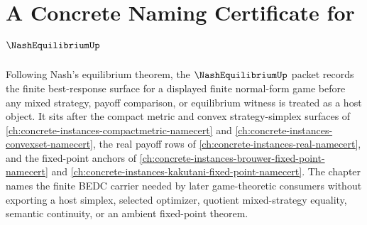 \chapter{A Concrete Naming Certificate for $\NashEquilibriumUp$}
\label{ch:concrete-instances-nash-equilibrium-namecert}

Following Nash's equilibrium theorem, the $\NashEquilibriumUp$ packet records the finite best-response surface for a displayed finite normal-form game before any mixed strategy, payoff comparison, or equilibrium witness is treated as a host object. It sits after the compact metric and convex strategy-simplex surfaces of \autoref{ch:concrete-instances-compactmetric-namecert} and \autoref{ch:concrete-instances-convexset-namecert}, the real payoff rows of \autoref{ch:concrete-instances-real-namecert}, and the fixed-point anchors of \autoref{ch:concrete-instances-brouwer-fixed-point-namecert} and \autoref{ch:concrete-instances-kakutani-fixed-point-namecert}. The chapter names the finite BEDC carrier needed by later game-theoretic consumers without exporting a host simplex, selected optimizer, quotient mixed-strategy equality, semantic continuity, or an ambient fixed-point theorem.

